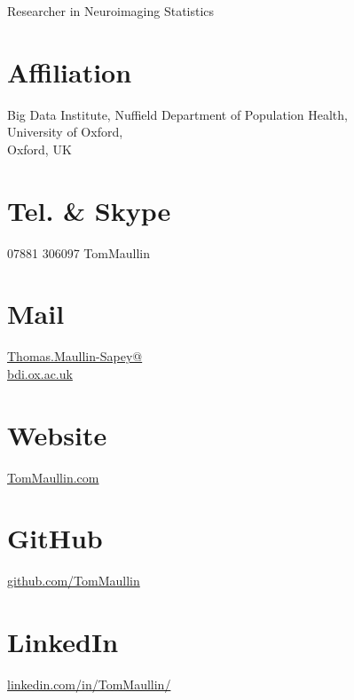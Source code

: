 \documentclass{friggeri-cv}
\begin{document}
      {\hspace{5cm} Researcher in Neuroimaging Statistics}
      

\begin{aside}
  \section{\normalsize{Affiliation}}
	\footnotesize{Big Data Institute,
Nuffield Department of Population Health,\\ University of Oxford,\\ Oxford, UK} 
    ~
  \section{\normalsize{Tel. \& Skype}}
    07881 306097
    TomMaullin
    ~
  \section{\normalsize{Mail}}
    \href{mailto:Thomas.Maullin-Sapey@bdi.ox.ac.uk}{Thomas.Maullin-Sapey@\\bdi.ox.ac.uk}
    ~
  \section{\normalsize{Website}}
    \href{https://TomMaullin.com}{TomMaullin.com}
    ~
  \section{\normalsize{GitHub}}
    \href{https://github.com/TomMaullin}{github.com/TomMaullin}
    ~
  \section{\normalsize{LinkedIn}}
    \href{https://linkedin.com/in/tommaullin/}{linkedin.com/in/TomMaullin/}
    ~

\end{aside}
\end{document}
